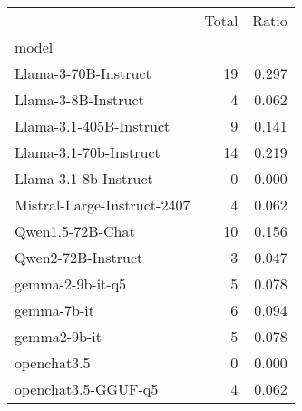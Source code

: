 \begin{tabular}{lrr}
 & Total & Ratio \\
model &  &  \\
Llama-3-70B-Instruct & 19 & 0.297 \\
Llama-3-8B-Instruct & 4 & 0.062 \\
Llama-3.1-405B-Instruct & 9 & 0.141 \\
Llama-3.1-70b-Instruct & 14 & 0.219 \\
Llama-3.1-8b-Instruct & 0 & 0.000 \\
Mistral-Large-Instruct-2407 & 4 & 0.062 \\
Qwen1.5-72B-Chat & 10 & 0.156 \\
Qwen2-72B-Instruct & 3 & 0.047 \\
gemma-2-9b-it-q5 & 5 & 0.078 \\
gemma-7b-it & 6 & 0.094 \\
gemma2-9b-it & 5 & 0.078 \\
openchat3.5 & 0 & 0.000 \\
openchat3.5-GGUF-q5 & 4 & 0.062 \\
\end{tabular}
